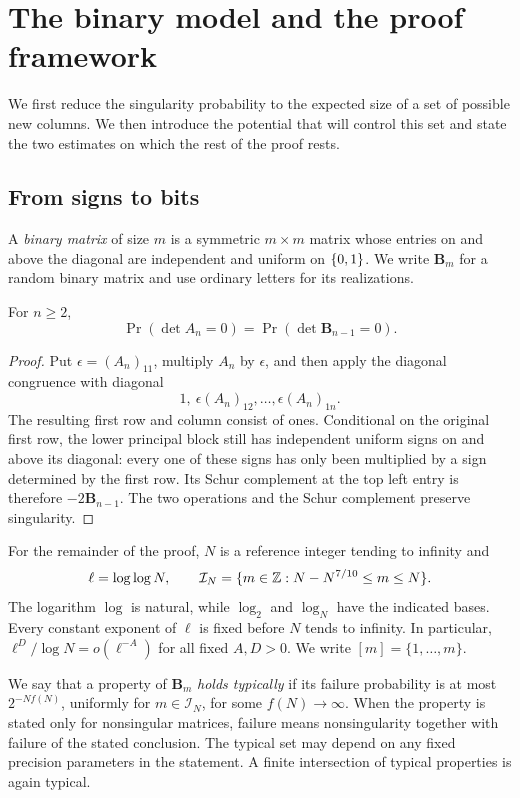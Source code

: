 \section{The binary model and the proof framework}\label{sec:framework}

We first reduce the singularity probability to the expected size of a set
of possible new columns. We then introduce the potential that will control
this set and state the two estimates on which the rest of the proof rests.

\subsection{From signs to bits}

A \emph{binary matrix} of size \(m\) is a symmetric \(m\times m\) matrix
whose entries on and above the diagonal are independent and uniform on
\(\{0,1\}\). We write \(\mathbf B_m\) for a random binary matrix and use
ordinary letters for its realizations.

\begin{lemma}\label{lem:sign-bit}
For \(n\ge2\),
\[
 \Pr(\det A_n=0)=\Pr(\det\mathbf B_{n-1}=0).
\]
\end{lemma}

\begin{proof}
Put \(\epsilon=(A_n)_{11}\), multiply \(A_n\) by \(\epsilon\), and then
apply the diagonal congruence with diagonal
\[
 1,\ \epsilon(A_n)_{12},\ldots,\epsilon(A_n)_{1n}.
\]
The resulting first row and column consist of ones. Conditional on the
original first row, the lower principal block still has independent
uniform signs on and above its diagonal: every one of these signs has
only been multiplied by a sign determined by the first row. Its Schur
complement at the top left entry is therefore \(-2\mathbf B_{n-1}\).
The two operations and the Schur complement preserve singularity.
\end{proof}

For the remainder of the proof, \(N\) is a reference integer tending to
infinity and
\[
 \ell=\log\log N,\qquad
 \mathcal I_N=\{m\in\mathbb Z:N-N^{7/10}\le m\le N\}.
\]
The logarithm \(\log\) is natural, while \(\log_2\) and \(\log_N\) have
the indicated bases. Every constant exponent of \(\ell\) is fixed before
\(N\) tends to infinity. In particular,
\(\ell^D/\log N=o(\ell^{-A})\) for all fixed \(A,D>0\).
We write \([m]=\{1,\ldots,m\}\).

We say that a property of \(\mathbf B_m\) \emph{holds typically} if its
failure probability is at most \(2^{-Nf(N)}\), uniformly for
\(m\in\mathcal I_N\), for some \(f(N)\to\infty\). When the property is
stated only for nonsingular matrices, failure means nonsingularity
together with failure of the stated conclusion. The typical set may
depend on any fixed precision parameters in the statement. A finite
intersection of typical properties is again typical.

